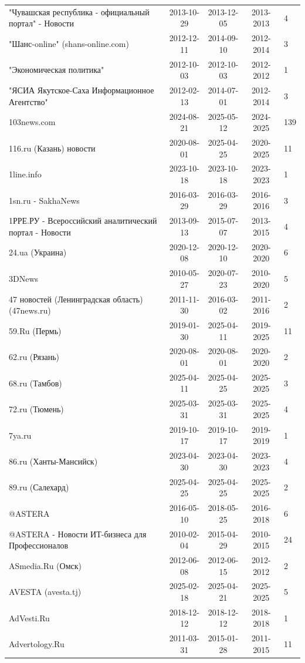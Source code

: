 \begin{longtable}{p{6cm}cccp{2cm}}
"Чувашская республика - официальный портал" - Новости & 2013-10-29 & 2013-12-05 & 2013-2013 & 4\\
"Шанс-online" (shans-online.com) & 2012-12-11 & 2014-09-10 & 2012-2014 & 3\\
"Экономическая политика" & 2012-10-03 & 2012-10-03 & 2012-2012 & 1\\
"ЯСИА Якутское-Саха Информационное Агентство" & 2012-02-13 & 2014-07-01 & 2012-2014 & 3\\
103news.com & 2024-08-21 & 2025-05-12 & 2024-2025 & 139\\
116.ru (Казань) новости & 2020-08-01 & 2025-04-25 & 2020-2025 & 11\\
1line.info & 2023-10-18 & 2023-10-18 & 2023-2023 & 1\\
1sn.ru - SakhaNews & 2016-03-29 & 2016-03-29 & 2016-2016 & 3\\
1РРЕ.РУ - Всероссийский аналитический портал - Новости & 2013-09-13 & 2015-07-07 & 2013-2015 & 4\\
24.ua (Украина) & 2020-12-08 & 2020-12-10 & 2020-2020 & 6\\
3DNews & 2010-05-27 & 2020-07-23 & 2010-2020 & 5\\
47 новостей (Ленинградская область) (47news.ru) & 2011-11-30 & 2016-03-02 & 2011-2016 & 2\\
59.Ru (Пермь) & 2019-01-30 & 2025-04-11 & 2019-2025 & 11\\
62.ru (Рязань) & 2020-08-01 & 2020-08-01 & 2020-2020 & 2\\
68.ru (Тамбов) & 2025-04-11 & 2025-04-25 & 2025-2025 & 3\\
72.ru (Тюмень) & 2025-03-31 & 2025-03-31 & 2025-2025 & 4\\
7ya.ru & 2019-10-17 & 2019-10-17 & 2019-2019 & 1\\
86.ru (Ханты-Мансийск) & 2023-04-30 & 2023-04-30 & 2023-2023 & 4\\
89.ru (Салехард) & 2025-04-25 & 2025-04-25 & 2025-2025 & 2\\
@ASTERA & 2016-05-10 & 2018-05-25 & 2016-2018 & 6\\
@ASTERA - Новости ИТ-бизнеса для Профессионалов & 2010-02-04 & 2015-04-29 & 2010-2015 & 24\\
ASmedia.Ru (Омск) & 2012-06-08 & 2012-06-15 & 2012-2012 & 2\\
AVESTA (avesta.tj) & 2025-02-18 & 2025-04-21 & 2025-2025 & 5\\
AdVesti.Ru & 2018-12-12 & 2018-12-12 & 2018-2018 & 1\\
Advertology.Ru & 2011-03-31 & 2015-01-28 & 2011-2015 & 11\\

\end{longtable}
